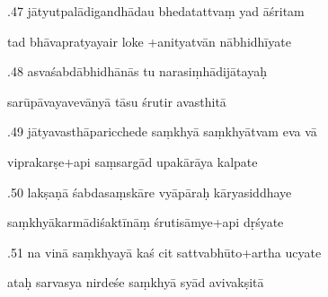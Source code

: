 \documentclass[article,12pt,a4paper]{memoir}%
\newcounter{parCount}
\begin{document}
	  
	  \pstart {}.47 jātyutpalādigandhādau bhedatattvaṃ yad āśritam 
	{}
	\pend%
      

	  
	  \pstart \leavevmode%
	tad bhāvapratyayair loke +anityatvān nābhidhīyate 
	{}
	\pend%
      

	  
	  \pstart {}.48 asvaśabdābhidhānās tu narasiṃhādijātayaḥ 
	{}
	\pend%
      

	  
	  \pstart \leavevmode%
	sarūpāvayavevānyā tāsu śrutir avasthitā 
	{}
	\pend%
      

	  
	  \pstart {}.49 jātyavasthāparicchede saṃkhyā saṃkhyātvam eva vā 
	{}
	\pend%
      

	  
	  \pstart \leavevmode%
	viprakarṣe+api saṃsargād upakārāya kalpate 
	{}
	\pend%
      

	  
	  \pstart {}.50 lakṣaṇā śabdasaṃskāre vyāpāraḥ kāryasiddhaye 
	{}
	\pend%
      

	  
	  \pstart \leavevmode%
	saṃkhyākarmādiśaktīnāṃ śrutisāmye+api dṛśyate 
	{}
	\pend%
      

	  
	  \pstart {}.51 na vinā saṃkhyayā kaś cit sattvabhūto+artha ucyate 
	{}
	\pend%
      

	  
	  \pstart \leavevmode%
	ataḥ sarvasya nirdeśe saṃkhyā syād avivakṣitā 
	{}
	\pend%
      
\end{document}
